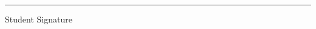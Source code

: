  \begin{flushright}
 \begin{minipage}{0.4\textwidth}
   \rule{0.9\linewidth}{0.5pt}
   \centering
   \vspace{5pt}
   Student Signature\\
  \end{minipage}
\end{flushright}
